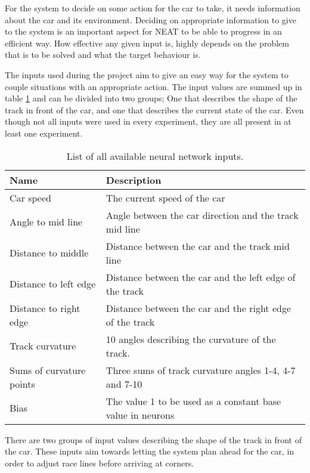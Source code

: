 For the system to decide on some action for the car to take, it needs information about the car and its environment. Deciding on appropriate information to give to the system is an important aspect for NEAT to be able to progress in an efficient way. How effective any given input is, highly depends on the problem that is to be solved and what the target behaviour is.

The inputs used during the project aim to give an easy way for the system to couple situations with an appropriate action. The input values are summed up in table \ref{tab:input_table} and can be divided into two groups; One that describes the shape of the track in front of the car, and one that describes the current state of the car. Even though not all inputs were used in every experiment, they are all present in at least one experiment.

\begin{table}[h!] 
  \centering
  \begin{tabular}{ll}
    \toprule
    Name & Description\\
    \midrule
    Car speed & The current speed of the car\\
    Angle to mid line & Angle between the car direction and the track mid line\\
    Distance to middle & Distance between the car and the track mid line\\
    Distance to left edge & Distance between the car and the left edge of the track\\
    Distance to right edge & Distance between the car and the right edge of the track\\
    Track curvature & 10 angles describing the curvature of the track. \\
    Sums of curvature points & Three sums of track curvature angles 1-4, 4-7 and 7-10\\
    Bias & The value 1 to be used as a constant base value in neurons\\
    \bottomrule
  \end{tabular}
  \caption{List of all available neural network inputs.}
  \label{tab:input_table}
\end{table}

\noindent

There are two groups of input values describing the shape of the track in front of the car. These inputs aim towards letting the system plan ahead for the car, in order to adjust race lines before arriving at corners. 

